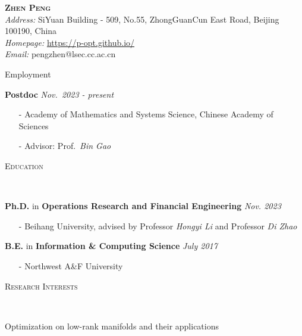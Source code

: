 \documentclass[a4paper, 10pt]{article}
\newenvironment{changemargin}[2]{%
  \begin{list}{}{%
    \setlength{\topsep}{0pt}%
    \setlength{\leftmargin}{#1}%
    \setlength{\rightmargin}{#2}%
    \setlength{\listparindent}{\parindent}%
    \setlength{\itemindent}{\parindent}%
    \setlength{\parsep}{\parskip}%
  }%
  \item[]}{\end{list}
}
\newcommand{\lineover}{
	\begin{changemargin}{-0.05in}{-0.05in}
		\vspace*{-8pt}
		\hrulefill \\
		\vspace*{-2pt}
	\end{changemargin}
}
\newcommand{\header}[1]{
	\begin{changemargin}{-0.5in}{-0.5in}
		\scshape{#1}\\
  	\lineover
	\end{changemargin}
}
\newcommand{\contact}[5]{
	\begin{changemargin}{-0.5in}{-0.5in}
		\begin{center}
			{\Large \scshape {#1}}\\ \smallskip
			{#2}\\ \smallskip
			{#3}\\ \smallskip
			{#4}\\ \smallskip
			{#5}\smallskip
		\end{center}
	\end{changemargin}
}
\newenvironment{body} {
	\vspace*{-16pt}
	\begin{changemargin}{-0.3in}{-0.5in}
  }	
	{\end{changemargin}
}
\begin{document}
\contact{\bf{Zhen Peng}
\vspace{6pt}}{\emph{Address: } SiYuan Building - 509, No.55, ZhongGuanCun East Road, Beijing 100190, China}{\emph{Homepage:} \url{https://p-opt.github.io/}}{\emph{Email:} pengzhen@lsec.cc.ac.cn}

\header{\LARGE{Employment}}
\begin{body}
	\vspace{18pt}
	\textbf{Postdoc}
	\hfill \emph{Nov.~2023 - present} \\
	\begin{itemize}
		\item[-] Academy of Mathematics and Systems Science, Chinese Academy of Sciences
		\item[-] Advisor: Prof.~\emph{Bin Gao}
	\end{itemize}
\end{body}

\bigskip
\header{\LARGE{Education}}
\begin{body}
	\vspace{18pt}

	\textbf{Ph.D.} in \textbf{Operations Research and Financial Engineering} \hfill \emph{Nov. 2023}
    \begin{itemize}
      \item[-] Beihang University, advised by Professor \emph{Hongyi Li} and Professor \emph{Di Zhao}
    \end{itemize}
    \textbf{B.E.} in \textbf{Information \& Computing Science } \hfill \emph{July 2017} \\
    \begin{itemize}
      \item[-] Northwest A\&F University
    \end{itemize}
\end{body}

\bigskip
\header{\LARGE{Research Interests}}
\begin{body}
\vspace{18pt}
Optimization on low-rank manifolds and their applications
\end{body}
\end{document}
